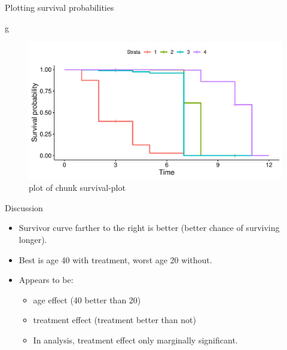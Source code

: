 \documentclass[ignorenonframetext,]{beamer}
\newenvironment{Shaded}{\begin{snugshade}}{\end{snugshade}}
\newcommand{\NormalTok}[1]{#1}
\begin{document}
\begin{frame}[fragile]{Plotting survival probabilities}
\protect\hypertarget{plotting-survival-probabilities}{}

\begin{Shaded}
\begin{Highlighting}[]
\NormalTok{g}
\end{Highlighting}
\end{Shaded}

\begin{figure}
\centering
\includegraphics{figure/survival-plot-1.pdf}
\caption{plot of chunk survival-plot}
\end{figure}

\end{frame}

\begin{frame}{Discussion}
\protect\hypertarget{discussion}{}

\begin{itemize}
\item
  Survivor curve farther to the right is better (better chance of
  surviving longer).
\item
  Best is age 40 with treatment, worst age 20 without.
\item
  Appears to be:

  \begin{itemize}
  \item
    age effect (40 better than 20)
  \item
    treatment effect (treatment better than not)
  \item
    In analysis, treatment effect only marginally significant.
  \end{itemize}
\end{itemize}

\end{frame}
\end{document}
